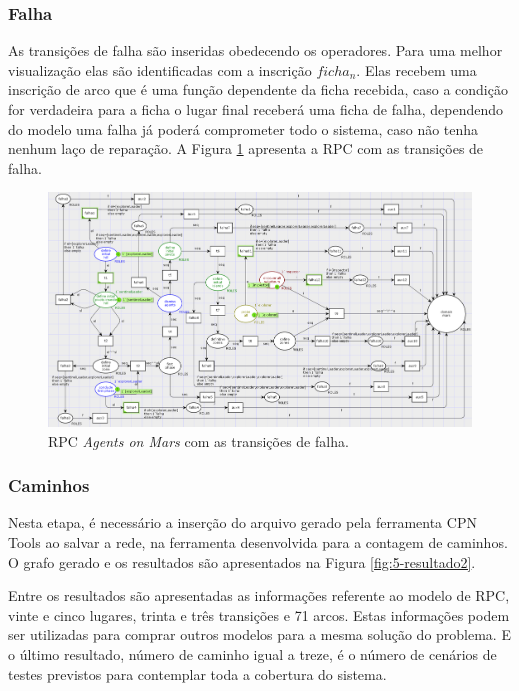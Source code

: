 \subsubsection{Falha}

As transições de falha são inseridas obedecendo os operadores. Para uma melhor visualização elas são identificadas com a inscrição $ficha_{n}$. Elas recebem uma inscrição de arco que é uma função dependente da ficha recebida, caso a condição for verdadeira para a ficha o lugar final receberá uma ficha de falha, dependendo do modelo uma falha já poderá comprometer todo o sistema, caso não tenha nenhum laço de reparação. A Figura \ref{fig:5-rpc-final2} apresenta a RPC com as transições de falha.

\begin{figure}
\centering
\includegraphics[scale=0.55]{imagens/5-implementacao2OK.png}
\caption{RPC \textit{Agents on Mars} com as transições de falha.}
\label{fig:5-rpc-final2}
\end{figure}

\subsubsection{Caminhos}
Nesta etapa, é necessário a inserção do arquivo gerado pela ferramenta CPN Tools ao salvar a rede, na ferramenta desenvolvida para a contagem de caminhos. O grafo gerado e os resultados são apresentados na Figura \ref{fig:5-resultado2}.

Entre os resultados são apresentadas as informações referente ao modelo de RPC, vinte e cinco lugares, trinta e três transições e 71 arcos. Estas informações podem ser utilizadas para comprar outros modelos para a mesma solução do problema. E o último resultado, número de caminho igual a treze, é o número de cenários de testes previstos para contemplar toda a cobertura do sistema.

